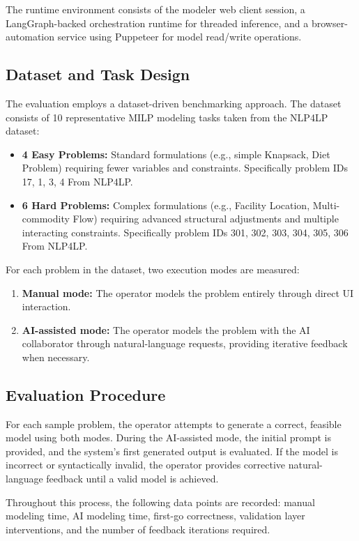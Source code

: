 The runtime environment consists of the modeler web client session, a LangGraph-backed orchestration runtime for threaded inference, and a browser-automation service using Puppeteer for model read/write operations.

\subsection{Dataset and Task Design}
The evaluation employs a dataset-driven benchmarking approach. The dataset consists of 10 representative MILP modeling tasks taken from the NLP4LP \cite{ahmaditeshnizi2023optimusoptimizationmodelingusing} dataset:
\begin{itemize}
    \item \textbf{4 Easy Problems:} Standard formulations (e.g., simple Knapsack, Diet Problem) requiring fewer variables and constraints. Specifically problem IDs 17, 1, 3, 4 From NLP4LP.
    \item \textbf{6 Hard Problems:} Complex formulations (e.g., Facility Location, Multi-commodity Flow) requiring advanced structural adjustments and multiple interacting constraints. Specifically problem IDs 301, 302, 303, 304, 305, 306 From NLP4LP.
\end{itemize}

For each problem in the dataset, two execution modes are measured:
\begin{enumerate}
    \item \textbf{Manual mode:} The operator models the problem entirely through direct UI interaction.
    \item \textbf{AI-assisted mode:} The operator models the problem with the AI collaborator through natural-language requests, providing iterative feedback when necessary.
\end{enumerate}

\subsection{Evaluation Procedure}
For each sample problem, the operator attempts to generate a correct, feasible model using both modes. During the AI-assisted mode, the initial prompt is provided, and the system's first generated output is evaluated. If the model is incorrect or syntactically invalid, the operator provides corrective natural-language feedback until a valid model is achieved. 

Throughout this process, the following data points are recorded: manual modeling time, AI modeling time, first-go correctness, validation layer interventions, and the number of feedback iterations required.

